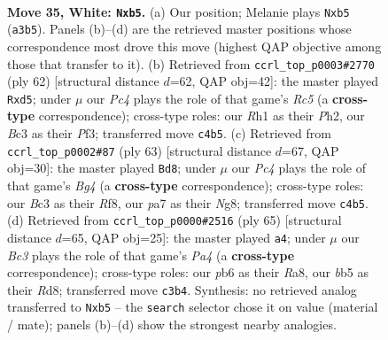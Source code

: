 \documentclass[11pt]{article}
\begin{document}
\clearpage

\begin{figure}[p]\centering
\begin{subfigure}{0.46\textwidth}\centering
\resizebox{\linewidth}{!}{%
\newchessgame
\chessboard[
  setfen={1rr5/p4p1k/1p2p1pp/1bn5/2P5/N1B1P2P/PR3PP1/5K1R w - - 0 35},
  showmover=false,
  pgfstyle=straightmove, color=movearrow, markmove={a3-b5}
]}
\caption{}
\end{subfigure}\hfill
\begin{subfigure}{0.46\textwidth}\centering
\resizebox{\linewidth}{!}{%
\newchessgame
\chessboard[
  setfen={r7/r4pk1/4pb1p/N1Rn2p1/p2B4/P4P2/KP1R2PP/8 w - - 2 32},
  showmover=false,
  pgfstyle=straightmove, color=movearrow, markmove={c5-d5}
]}
\caption{}
\end{subfigure}
\\[4pt]
\begin{subfigure}{0.46\textwidth}\centering
\resizebox{\linewidth}{!}{%
\newchessgame
\chessboard[
  setfen={2k1rrn1/2p5/p1p5/1p2Ppb1/5B1p/2N4P/PPP3P1/4RR1K b - - 5 32},
  showmover=false,
  pgfstyle=straightmove, color=movearrow, markmove={g5-d8}
]}
\caption{}
\end{subfigure}\hfill
\begin{subfigure}{0.46\textwidth}\centering
\resizebox{\linewidth}{!}{%
\newchessgame
\chessboard[
  setfen={r2r3k/1p4p1/6bp/p1n5/2BNp3/2P1R2P/1P1R1PP1/6K1 b - - 5 33},
  showmover=false,
  pgfstyle=straightmove, color=movearrow, markmove={a5-a4}
]}
\caption{}
\end{subfigure}
\caption{\textbf{Move 35, White: \texttt{Nxb5}.} (a) Our position; Melanie plays \texttt{Nxb5} (\texttt{a3b5}). Panels (b)--(d) are the retrieved master positions whose correspondence most drove this move (highest QAP objective among those that transfer to it). (b) Retrieved from \texttt{ccrl\_top\_p0003\#2770} (ply 62) [structural distance $d$=62, QAP obj=42]: the master played \texttt{Rxd5}; under $\mu$ our \emph{Pc4} plays the role of that game's \emph{Rc5} (a \textbf{cross-type} correspondence); cross-type roles: our \emph{R}h1 as their \emph{P}h2, our \emph{B}c3 as their \emph{P}f3; transferred move \texttt{c4b5}. (c) Retrieved from \texttt{ccrl\_top\_p0002\#87} (ply 63) [structural distance $d$=67, QAP obj=30]: the master played \texttt{Bd8}; under $\mu$ our \emph{Pc4} plays the role of that game's \emph{Bg4} (a \textbf{cross-type} correspondence); cross-type roles: our \emph{B}c3 as their \emph{R}f8, our \emph{p}a7 as their \emph{N}g8; transferred move \texttt{c4b5}. (d) Retrieved from \texttt{ccrl\_top\_p0000\#2516} (ply 65) [structural distance $d$=65, QAP obj=25]: the master played \texttt{a4}; under $\mu$ our \emph{Bc3} plays the role of that game's \emph{Pa4} (a \textbf{cross-type} correspondence); cross-type roles: our \emph{p}b6 as their \emph{R}a8, our \emph{b}b5 as their \emph{R}d8; transferred move \texttt{c3b4}. Synthesis: no retrieved analog transferred to \texttt{Nxb5} -- the \texttt{search} selector chose it on value (material / mate); panels (b)--(d) show the strongest nearby analogies.}
\label{fig:thought-m68}
\end{figure}
\end{document}
